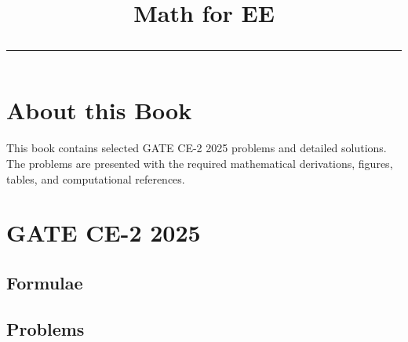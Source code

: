 \documentclass[journal]{IEEEtran}
\begin{document}

\onecolumn

\title{
    \begin{center}
    Math for EE
    \\
    \rule{0.4\columnwidth}{0.4pt}
    \end{center}
}

\section*{About this Book}
This book contains selected GATE CE-2 2025 problems and detailed solutions.
The problems are presented with the required mathematical derivations,
figures, tables, and computational references.

\newpage
\tableofcontents
\newpage
\onecolumn

\section{GATE CE-2 2025}

\subsection{Formulae}
\renewcommand{\theequation}{1.1.\arabic{equation}}


\newpage
\subsection{Problems}
\setcounter{equation}{0}
\renewcommand{\theequation}{1.2.\arabic{equation}}
\renewcommand{\theenumi}{1.2.\arabic{enumi}}
\renewcommand{\labelenumi}{\theenumi}

\end{document}
